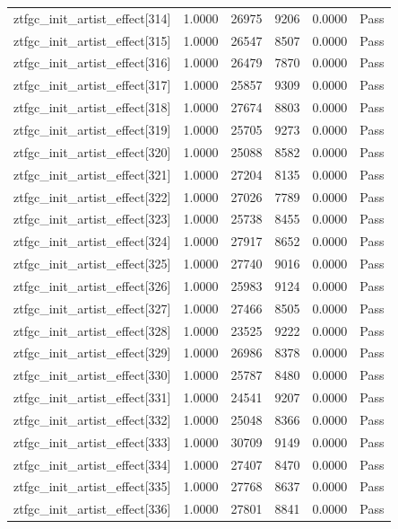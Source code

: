 \begin{table}[htbp]
\begin{tabular}{llrrll}
ztfgc\_init\_artist\_effect[314] & 1.0000 & 26975 & 9206 & 0.0000 & Pass \\
ztfgc\_init\_artist\_effect[315] & 1.0000 & 26547 & 8507 & 0.0000 & Pass \\
ztfgc\_init\_artist\_effect[316] & 1.0000 & 26479 & 7870 & 0.0000 & Pass \\
ztfgc\_init\_artist\_effect[317] & 1.0000 & 25857 & 9309 & 0.0000 & Pass \\
ztfgc\_init\_artist\_effect[318] & 1.0000 & 27674 & 8803 & 0.0000 & Pass \\
ztfgc\_init\_artist\_effect[319] & 1.0000 & 25705 & 9273 & 0.0000 & Pass \\
ztfgc\_init\_artist\_effect[320] & 1.0000 & 25088 & 8582 & 0.0000 & Pass \\
ztfgc\_init\_artist\_effect[321] & 1.0000 & 27204 & 8135 & 0.0000 & Pass \\
ztfgc\_init\_artist\_effect[322] & 1.0000 & 27026 & 7789 & 0.0000 & Pass \\
ztfgc\_init\_artist\_effect[323] & 1.0000 & 25738 & 8455 & 0.0000 & Pass \\
ztfgc\_init\_artist\_effect[324] & 1.0000 & 27917 & 8652 & 0.0000 & Pass \\
ztfgc\_init\_artist\_effect[325] & 1.0000 & 27740 & 9016 & 0.0000 & Pass \\
ztfgc\_init\_artist\_effect[326] & 1.0000 & 25983 & 9124 & 0.0000 & Pass \\
ztfgc\_init\_artist\_effect[327] & 1.0000 & 27466 & 8505 & 0.0000 & Pass \\
ztfgc\_init\_artist\_effect[328] & 1.0000 & 23525 & 9222 & 0.0000 & Pass \\
ztfgc\_init\_artist\_effect[329] & 1.0000 & 26986 & 8378 & 0.0000 & Pass \\
ztfgc\_init\_artist\_effect[330] & 1.0000 & 25787 & 8480 & 0.0000 & Pass \\
ztfgc\_init\_artist\_effect[331] & 1.0000 & 24541 & 9207 & 0.0000 & Pass \\
ztfgc\_init\_artist\_effect[332] & 1.0000 & 25048 & 8366 & 0.0000 & Pass \\
ztfgc\_init\_artist\_effect[333] & 1.0000 & 30709 & 9149 & 0.0000 & Pass \\
ztfgc\_init\_artist\_effect[334] & 1.0000 & 27407 & 8470 & 0.0000 & Pass \\
ztfgc\_init\_artist\_effect[335] & 1.0000 & 27768 & 8637 & 0.0000 & Pass \\
ztfgc\_init\_artist\_effect[336] & 1.0000 & 27801 & 8841 & 0.0000 & Pass \\

\end{tabular}
\end{table}
